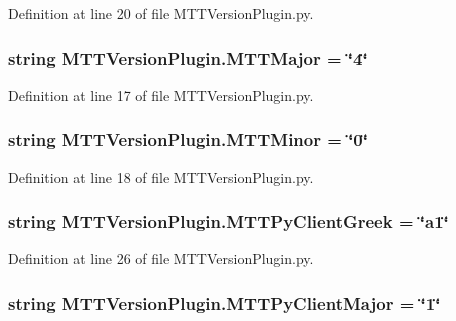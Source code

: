 Definition at line 20 of file M\-T\-T\-Version\-Plugin.\-py.

\hypertarget{namespaceMTTVersionPlugin_af9e75ea5f854bed820d4cb64fa455124}{
\subsubsection[{M\-T\-T\-Major}]{\setlength{\rightskip}{0pt plus 5cm}string M\-T\-T\-Version\-Plugin.\-M\-T\-T\-Major = \char`\"{}4\char`\"{}}}\label{namespaceMTTVersionPlugin_af9e75ea5f854bed820d4cb64fa455124}


Definition at line 17 of file M\-T\-T\-Version\-Plugin.\-py.

\hypertarget{namespaceMTTVersionPlugin_ad80f82936d1bc7547278d4ce2ea3a275}{
\subsubsection[{M\-T\-T\-Minor}]{\setlength{\rightskip}{0pt plus 5cm}string M\-T\-T\-Version\-Plugin.\-M\-T\-T\-Minor = \char`\"{}0\char`\"{}}}\label{namespaceMTTVersionPlugin_ad80f82936d1bc7547278d4ce2ea3a275}


Definition at line 18 of file M\-T\-T\-Version\-Plugin.\-py.

\hypertarget{namespaceMTTVersionPlugin_a6df21a21318661784dcabdb81450ff48}{
\subsubsection[{M\-T\-T\-Py\-Client\-Greek}]{\setlength{\rightskip}{0pt plus 5cm}string M\-T\-T\-Version\-Plugin.\-M\-T\-T\-Py\-Client\-Greek = \char`\"{}a1\char`\"{}}}\label{namespaceMTTVersionPlugin_a6df21a21318661784dcabdb81450ff48}


Definition at line 26 of file M\-T\-T\-Version\-Plugin.\-py.

\hypertarget{namespaceMTTVersionPlugin_a51adbd87756e59f2189831112aad767e}{
\subsubsection[{M\-T\-T\-Py\-Client\-Major}]{\setlength{\rightskip}{0pt plus 5cm}string M\-T\-T\-Version\-Plugin.\-M\-T\-T\-Py\-Client\-Major = \char`\"{}1\char`\"{}}}\label{namespaceMTTVersionPlugin_a51adbd87756e59f2189831112aad767e}


